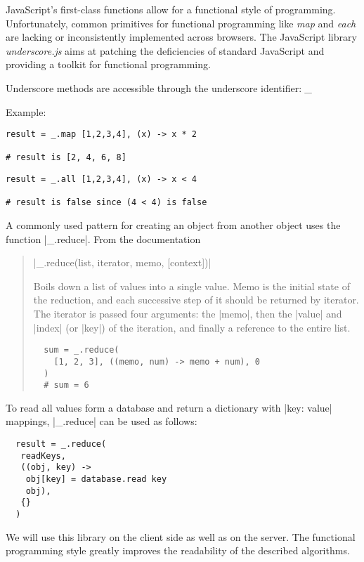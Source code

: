 JavaScript's first-class functions allow for a functional style of programming.
Unfortunately, common primitives for functional programming like \emph{map} and
\emph{each} are lacking or inconsistently implemented across browsers. The
JavaScript library \emph{underscore.js} aims at patching the deficiencies of
standard JavaScript and providing a toolkit for functional programming.

Underscore methods are accessible through the underscore identifier: \emph{\_}

Example:

\begin{verbatim}
result = _.map [1,2,3,4], (x) -> x * 2

# result is [2, 4, 6, 8]
\end{verbatim}

\begin{verbatim}
result = _.all [1,2,3,4], (x) -> x < 4

# result is false since (4 < 4) is false
\end{verbatim}

A commonly used pattern for creating an object from another object uses the
function |_.reduce|. From the documentation

\begin{quote}
 |_.reduce(list, iterator, memo, [context])|

 Boils down a list of values into a single value. Memo is the initial state of
 the reduction, and each successive step of it should be returned by iterator.
 The iterator is passed four arguments: the |memo|, then the |value| and |index|
 (or |key|) of the iteration, and finally a reference to the entire list.

 \begin{verbatim}
  sum = _.reduce(
    [1, 2, 3], ((memo, num) -> memo + num), 0
  )
  # sum = 6
 \end{verbatim}
\end{quote}

To read all values form a database and return a dictionary with |key: value|
mappings, |_.reduce| can be used as follows:

\begin{verbatim}
  result = _.reduce(
   readKeys,
   ((obj, key) ->
    obj[key] = database.read key
    obj),
   {}
  )
\end{verbatim}

We will use this library on the client side as well as on the server. The
functional programming style greatly improves the readability of the described
algorithms.

